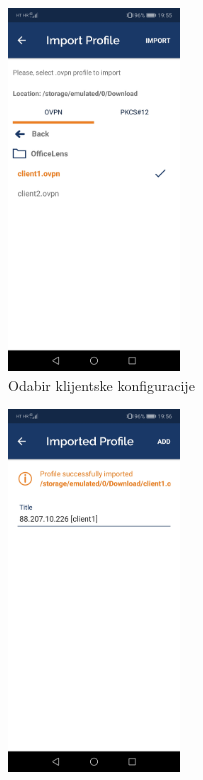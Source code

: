 \begin{figure}[h]
\begin{subfigure}{0.49\textwidth}
		\includegraphics[width = 0.5\textwidth]{slike/OpenVPN/Screenshot_20181214-195554}
		\caption{Odabir klijentske konfiguracije}
		\label{fig:screenshot20181214-195554}
	\end{subfigure}
	\begin{subfigure}{0.49\textwidth}
		\centering
		\includegraphics[width = 0.5\textwidth]{slike/OpenVPN/Screenshot_20181214-195602}

\end{subfigure}
\end{figure}
